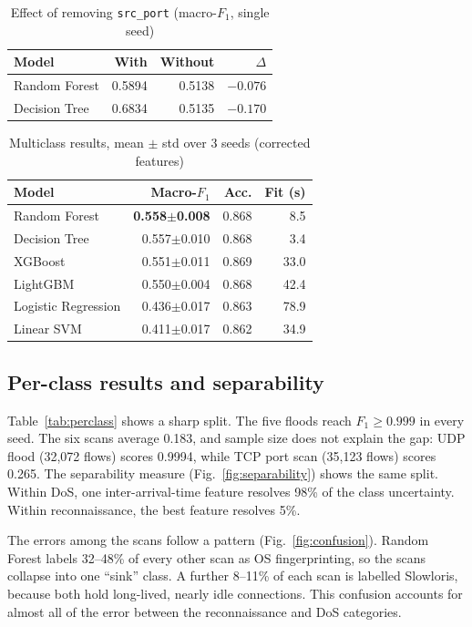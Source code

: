 \documentclass[preprint,12pt]{elsarticle}
\newcommand{\col}[1]{\texttt{\small #1}}
\begin{document}
\begin{table}[!t]
\caption{Effect of removing \col{src\_\allowbreak{}port} (macro-$F_1$, single seed)}
\label{tab:srcport}
\centering
\footnotesize
\begin{tabular}{@{}lrrr@{}}
\toprule
\textbf{Model} & \textbf{With} & \textbf{Without} & \textbf{$\Delta$} \\
\midrule
Random Forest & 0.5894 & 0.5138 & $-0.076$ \\
Decision Tree & 0.6834 & 0.5135 & $\mathbf{-0.170}$ \\
\bottomrule
\end{tabular}
\end{table}

\begin{table}[!t]
\caption{Multiclass results, mean $\pm$ std over 3 seeds (corrected features)}
\label{tab:results}
\centering
\footnotesize
\begin{tabular}{@{}lrrr@{}}
\toprule
\textbf{Model} & \textbf{Macro-$F_1$} & \textbf{Acc.} & \textbf{Fit (s)} \\
\midrule
Random Forest & \textbf{0.558$\pm$0.008} & 0.868 & 8.5 \\
Decision Tree & 0.557$\pm$0.010 & 0.868 & 3.4 \\
XGBoost & 0.551$\pm$0.011 & 0.869 & 33.0 \\
LightGBM & 0.550$\pm$0.004 & 0.868 & 42.4 \\
Logistic Regression & 0.436$\pm$0.017 & 0.863 & 78.9 \\
Linear SVM & 0.411$\pm$0.017 & 0.862 & 34.9 \\
\bottomrule
\end{tabular}
\end{table}

\subsection{Per-class results and separability}

Table~\ref{tab:perclass} shows a sharp split. The five floods reach $F_1 \ge 0.999$ in every seed. The six scans average 0.183, and sample size does not explain the gap: UDP flood (32,072 flows) scores 0.9994, while TCP port scan (35,123 flows) scores 0.265. The separability measure (Fig.~\ref{fig:separability}) shows the same split. Within DoS, one inter-arrival-time feature resolves 98\% of the class uncertainty. Within reconnaissance, the best feature resolves 5\%.

The errors among the scans follow a pattern (Fig.~\ref{fig:confusion}). Random Forest labels 32--48\% of every other scan as OS fingerprinting, so the scans collapse into one ``sink'' class. A further 8--11\% of each scan is labelled Slowloris, because both hold long-lived, nearly idle connections. This confusion accounts for almost all of the error between the reconnaissance and DoS categories.
\end{document}
